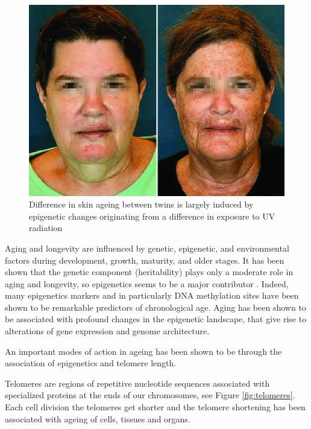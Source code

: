 \documentclass[
  11pt,
]{book}
\begin{document}
\begin{figure}

{\centering \includegraphics[width=0.5\linewidth]{./figs/dentical-twins-with-phenotypic-discordance-due-to-environmental-exposure-Although-MZ} 

}

\caption{Difference in skin ageing between twins is largely induced by epigenetic changes originating from a difference in exposure to UV radiation \citep{Schwab2017}}\label{fig:epiUV}
\end{figure}

Aging and longevity are influenced by genetic, epigenetic, and environmental factors during development, growth, maturity, and older stages.
It has been shown that the genetic component (heritability) plays only a moderate role in aging and longevity, so epigenetics seems to be a major contributor \citep{Adwan2018}. Indeed, many epigenetics markers and in particularly DNA methylation sites have been shown to be remarkable predictors of chronological age.
Aging has been shown to be associated
with profound changes in the epigenetic landscape, that give rise to alterations of gene expression and genome architecture.

An important modes of action in ageing has been shown to be through the association of epigenetics and telomere length.

Telomeres are regions of repetitive nucleotide sequences associated with specialized proteins at the ends of our chromosomes, see Figure \ref{fig:telomeres}. Each cell division the telomeres get shorter and the telomere shortening has been associated with ageing of cells, tissues and organs.
\end{document}

